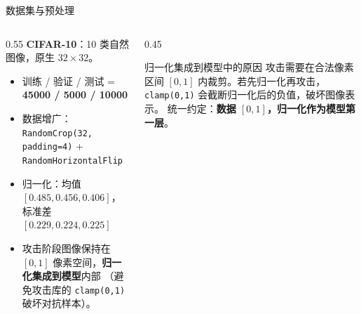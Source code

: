 \documentclass[aspectratio=169,11pt]{beamer}
\begin{document}
\begin{frame}{数据集与预处理}
  \begin{columns}[T]
    \begin{column}{0.55\textwidth}
      \textbf{CIFAR-10}：10 类自然图像，原生 $32\times32$。
      \begin{itemize}
        \item 训练 / 验证 / 测试 = \textbf{45000 / 5000 / 10000}
        \item 数据增广：\texttt{RandomCrop(32, padding=4)} + \texttt{RandomHorizontalFlip}
        \item 归一化：均值 $[0.485,0.456,0.406]$，标准差 $[0.229,0.224,0.225]$
        \item 攻击阶段图像保持在 $[0,1]$ 像素空间，\textbf{归一化集成到模型}内部
              （避免攻击库的 \texttt{clamp(0,1)} 破坏对抗样本）。
      \end{itemize}
    \end{column}
    \begin{column}{0.45\textwidth}
      \begin{block}{归一化集成到模型中的原因}
        \footnotesize
        攻击需要在合法像素区间 $[0,1]$ 内裁剪。若先归一化再攻击，
        \texttt{clamp(0,1)} 会截断归一化后的负值，破坏图像表示。
        统一约定：\textbf{数据 $[0,1]$，归一化作为模型第一层}。
      \end{block}
    \end{column}
  \end{columns}
\end{frame}
\end{document}

